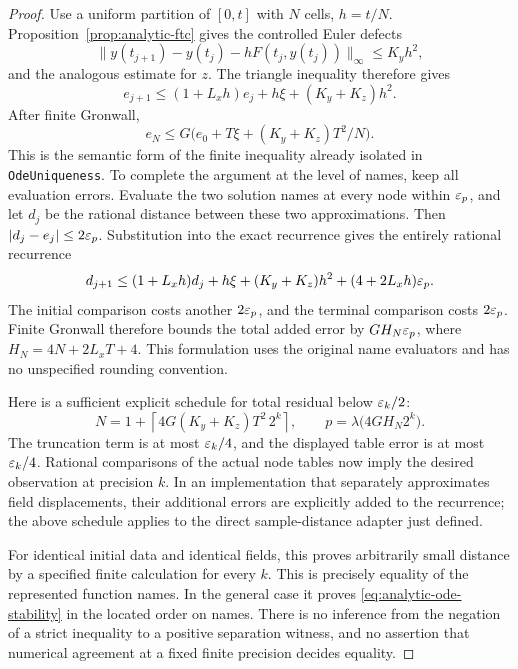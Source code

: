 \begin{proof}
Use a uniform partition of $[0,t]$ with $N$ cells, $h=t/N$.  Proposition~\ref{prop:analytic-ftc} gives the controlled Euler defects
\[
 \|y(t_{j+1})-y(t_j)-hF(t_j,y(t_j))\|_\infty\le K_yh^2,
\]
and the analogous estimate for $z$.  The triangle inequality therefore gives
\[
 e_{j+1}\le(1+L_xh)e_j+h\xi+(K_y+K_z)h^2.
\]
After finite Gronwall,
\begin{equation}
 e_N\le G\bigl(e_0+T\xi+(K_y+K_z)T^2/N\bigr).
 \label{eq:analytic-uniqueness-grid}
\end{equation}
This is the semantic form of the finite inequality already isolated in \texttt{OdeUniqueness}.  To complete the argument at the level of names, keep all evaluation errors.  Evaluate the two solution names at every node within $\varepsilon_p$, and let $d_j$ be the rational distance between these two approximations.  Then $|d_j-e_j|\le2\varepsilon_p$.  Substitution into the exact recurrence gives the entirely rational recurrence\[
 d_{j+1}\le(1+L_xh)d_j+h\xi+(K_y+K_z)h^2+
                    (4+2L_xh)\varepsilon_p.
\]
The initial comparison costs another $2\varepsilon_p$, and the terminal comparison costs $2\varepsilon_p$.  Finite Gronwall therefore bounds the total added error by $G H_N\varepsilon_p$, where $H_N=4N+2L_xT+4$.  This formulation uses the original name evaluators and has no unspecified rounding convention.

Here is a sufficient explicit schedule for total residual below $\varepsilon_k/2$:
\[
 N=1+\left\lceil4G(K_y+K_z)T^2\,2^k\right\rceil,
 \qquad
 p=\lambda\bigl(4G H_N2^k\bigr).
\]
The truncation term is at most $\varepsilon_k/4$, and the displayed table error is at most $\varepsilon_k/4$.  Rational comparisons of the actual node tables now imply the desired observation at precision $k$.  In an implementation that separately approximates field displacements, their additional errors are explicitly added to the recurrence; the above schedule applies to the direct sample-distance adapter just defined.

For identical initial data and identical fields, this proves arbitrarily small distance by a specified finite calculation for every $k$.  This is precisely equality of the represented function names.  In the general case it proves \eqref{eq:analytic-ode-stability} in the located order on names.  There is no inference from the negation of a strict inequality to a positive separation witness, and no assertion that numerical agreement at a fixed finite precision decides equality.
\end{proof}

